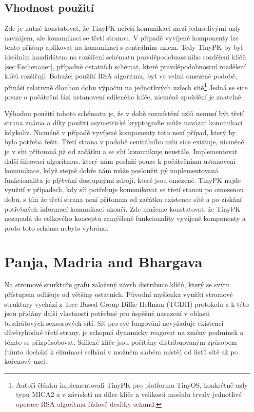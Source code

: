 \documentclass[11pt,final,twoside]{fithesis2}
\begin{document}
\subsection{Vhodnost použití}

Zde je nutné konstatovat, že TinyPK neřeší komunikaci mezi jednotlivými uzly navzájem, ale komunikaci se třetí stranou. V případě vyvíjené 
komponenty lze tento přístup aplikovat na komunikaci s centrálním uzlem. Tedy TinyPK by byl ideálním kandidátem na rozšíření schématu pravděpodobnostního
rozdělení klíčů \ref{sec:Eschenauer}, případně ostatních schémat, které pravděpodobnostní rozdělení klíčů rozšiřují.
Bohužel použití RSA algoritmu, byť ve velmi omezené podobě, přináší relativně dlouhou dobu výpočtu na jednotlivých uzlech sítě\footnote{ 
Autoři článku implementovali TinyPK pro platformu TinyOS, konkrétně uzly typu MICA2 \cite{Inc.} a v závisloti na dílce klíče a velikosti modulu
trvaly jednotlivé operace RSA algoritmu řádově desítky sekund.} Jedná se sice pouze o počáteční fázi ustanovení sdíleného klíče, nicméně zpoždění je znatelné.

Výhodou použití tohoto schématu je, že v době rozmístění uzlů nemusí být třetí strana známa a díky použití asymetrické kryptografie může navázat komunikaci kdykoliv.
Nicméně v případě vyvíjené komponenty toto není případ, který by bylo potřeba řešit. Třetí strana v podobě centrálního uzlu sice existuje, nicméně je v síti přítomná již 
od začátku a se sítí komunikuje neustále. Implementovat další šifrovací algoritmus, který nám posluží pouze k počátečnímu ustanovení komunikace, když stejně dobře 
nám může posloužit jiý implementovaná funkcionalita je plýtvání dostupnými zdroji, které jsou omezené. TinyPK najde využití v případech, kdy síť potřebuje komunikovat
se třetí stanou po omezenou dobu, s tím že třetí strana není přítomna od začátku existence sítě a po získání potřebných informací komunikaci ukončí. Zde můžeme konstatovat, že 
TinyPK nezapadá do celkového konceptu zamýšlené funkcionality vyvíjené komponenty a proto toto schéma nebylo vybráno. 

\section{Panja, Madria and Bhargava}

Na stromové sturktuře grafu založený návrh \cite{Panja2007} distribuce klíčů, který se svým přístupem odlišuje od většiny ostatních. Původní myšlenka využítí stromové struktury
vychází z Tree Based Group Diffie-Hellman (TGDH) protokolu \cite{Kim2000} a k této jsou přidány další vlastnosti potřebné pro úspěšné nasazení v oblasti bezdrátových sensorových sítí. 
Síť pro své fungování nevyžaduje existenci důvěryhodné třetí strany, je schopná dynamicky reagovat na změny podmínek a těmto se přizpůsobovat. Sdílené klíče jsou počítány distribuovaným 
způsobem (tímto dochází k eliminaci selhání v možném slabém místě) od listů sítě až po kořenový uzel.  
\end{document}
